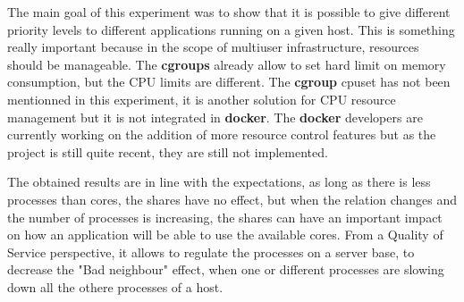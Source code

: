 The main goal of this experiment was to show that it is possible to give different
priority levels to different applications running on a given host. This is something
really important because in the scope of multiuser infrastructure, resources
should be manageable. The \textbf{cgroups} already allow to set hard limit on memory
consumption, but the CPU limits are different. The \textbf{cgroup} cpuset has not
been mentionned in this experiment, it is another solution for CPU resource
management but it is not integrated in \textbf{docker}. The \textbf{docker} developers
are currently working on the addition of more resource control features but as the project
is still quite recent, they are still not implemented.

The obtained results are in line with the expectations, as long as there is less processes
than cores, the shares have no effect, but when the relation changes and the number of
processes is increasing, the shares can have an important impact on how an application
will be able to use the available cores. From a Quality of Service perspective, it allows
to regulate the processes on a server base, to decrease the "Bad neighbour" effect, when
one or different processes are slowing down all the othere processes of a host.
